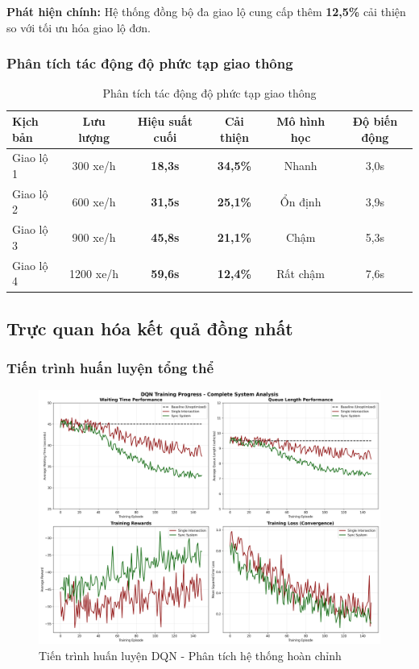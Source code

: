 \textbf{Phát hiện chính:} Hệ thống đồng bộ đa giao lộ cung cấp thêm \textbf{12,5\%} 
cải thiện so với tối ưu hóa giao lộ đơn.

\subsubsection{Phân tích tác động độ phức tạp giao thông}

\begin{table}[!htp]
    \centering
    \caption{Phân tích tác động độ phức tạp giao thông}
    \label{tab:traffic_complexity_analysis}
    \begin{tabular}{@{}lccccc@{}}
        \toprule 
        \textbf{Kịch bản} & \textbf{Lưu lượng} & \textbf{Hiệu suất cuối} & \textbf{Cải thiện} & \textbf{Mô hình học} & \textbf{Độ biến động} \\
        \midrule 
        Giao lộ 1 & 300 xe/h & \textbf{18,3s} & \textbf{34,5\%} & Nhanh & 3,0s \\
        Giao lộ 2 & 600 xe/h & \textbf{31,5s} & \textbf{25,1\%} & Ổn định & 3,9s \\
        Giao lộ 3 & 900 xe/h & \textbf{45,8s} & \textbf{21,1\%} & Chậm & 5,3s \\
        Giao lộ 4 & 1200 xe/h & \textbf{59,6s} & \textbf{12,4\%} & Rất chậm & 7,6s \\
        \bottomrule
    \end{tabular}
\end{table}

\subsection{Trực quan hóa kết quả đồng nhất}

\subsubsection{Tiến trình huấn luyện tổng thể}

\begin{figure}[!htp]
    \centering
    \includegraphics[width=\textwidth]{figures/01_training_progress.png}
    \caption{Tiến trình huấn luyện DQN - Phân tích hệ thống hoàn chỉnh}
    \label{fig:comprehensive_training_progress}
\end{figure}

